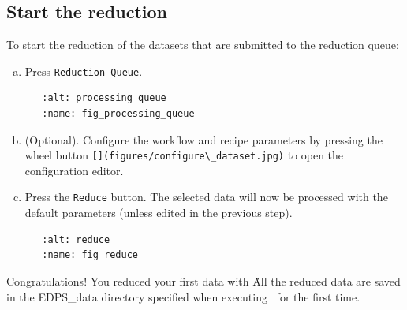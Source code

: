 \subsection{Start the reduction}
To start the reduction of the datasets that are submitted to the reduction queue:
\begin{enumerate}[a)]
\item  Press \texttt{Reduction Queue}.

\begin{verbatim}
   :alt: processing_queue
   :name: fig_processing_queue
\end{verbatim}

\item  (Optional). Configure the workflow and recipe parameters by pressing the wheel 
button \verb|[](figures/configure\_dataset.jpg)| to open the configuration editor.

\item  Press the \texttt{Reduce} button. The selected data will now be processed with the default parameters (unless edited in the previous step).

\begin{verbatim}
   :alt: reduce
   :name: fig_reduce
\end{verbatim}

\end{enumerate}


Congratulations! You reduced your first data with \edpsgui\. All the
reduced data are saved in the EDPS\_data directory specified when
executing \edpsgui\ for the first time.
